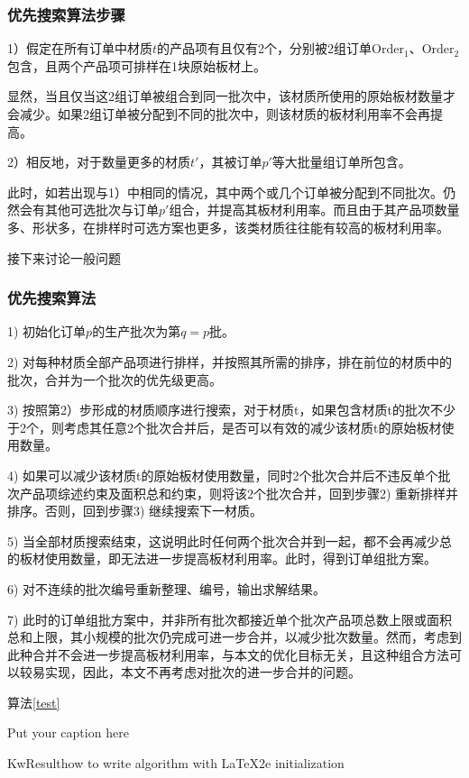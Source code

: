 \documentclass[bwprint]{gmcmthesis}
\begin{document}
\subsubsection{优先搜索算法步骤}
1）假定在所有订单中材质$t$的产品项有且仅有2个，分别被2组订单$\text{Order}_1$、$\text{Order}_2$包含，且两个产品项可排样在1块原始板材上。

显然，当且仅当这2组订单被组合到同一批次中，该材质所使用的原始板材数量才会减少。如果2组订单被分配到不同的批次中，则该材质的板材利用率不会再提高。

2）相反地，对于数量更多的材质$t'$，其被订单$p'$等大批量组订单所包含。

此时，如若出现与1）中相同的情况，其中两个或几个订单被分配到不同批次。仍然会有其他可选批次与订单$p'$组合，并提高其板材利用率。而且由于其产品项数量多、形状多，在排样时可选方案也更多，该类材质往往能有较高的板材利用率。

接下来讨论一般问题



\subsubsection{优先搜索算法}
1) 初始化订单$p$的生产批次为第$q=p$批。

2) 对每种材质全部产品项进行排样，并按照其所需的排序，排在前位的材质中的批次，合并为一个批次的优先级更高。

3) 按照第2）步形成的材质顺序进行搜索，对于材质t，如果包含材质t的批次不少于2个，则考虑其任意2个批次合并后，是否可以有效的减少该材质t的原始板材使用数量。

4) 如果可以减少该材质t的原始板材使用数量，同时2个批次合并后不违反单个批次产品项综述约束及面积总和约束，则将该2个批次合并，回到步骤2) 重新排样并排序。否则，回到步骤3) 继续搜索下一材质。

5) 当全部材质搜索结束，这说明此时任何两个批次合并到一起，都不会再减少总的板材使用数量，即无法进一步提高板材利用率。此时，得到订单组批方案。

6) 对不连续的批次编号重新整理、编号，输出求解结果。

7) 此时的订单组批方案中，并非所有批次都接近单个批次产品项总数上限或面积总和上限，其小规模的批次仍完成可进一步合并，以减少批次数量。然而，考虑到此种合并不会进一步提高板材利用率，与本文的优化目标无关，且这种组合方法可以较易实现，因此，本文不再考虑对批次的进一步合并的问题。

算法\ref{test}
\begin{algorithm}
    \caption{Put your caption here}\label{test}
    \begin{multicols}{2}
        \SetAlgoLined
        KwResult{how to write algorithm with \LaTeX2e }
        initialization\;
    \end{multicols}
\end{algorithm}
\end{document}
